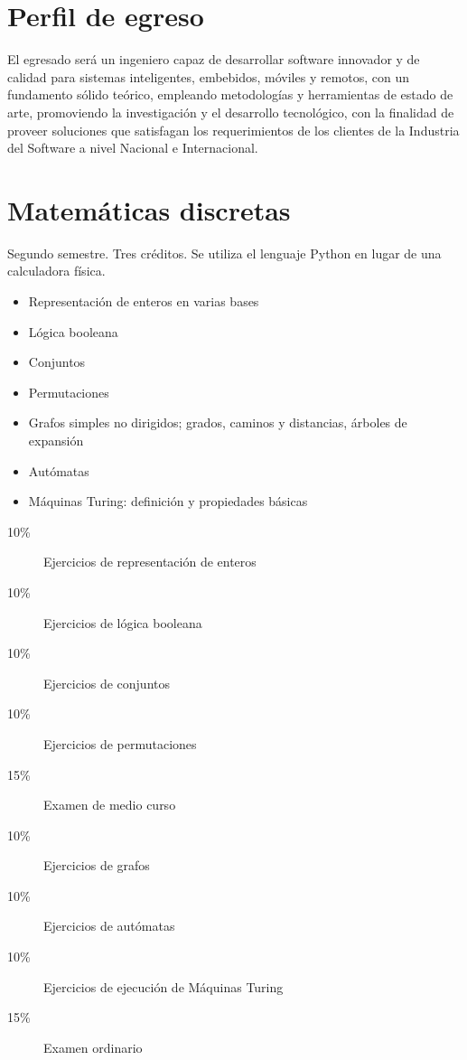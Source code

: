 \documentclass{article}
\begin{document}
\begin{multicols}{4}

\section*{Perfil de egreso}

El egresado ser\'{a} un ingeniero capaz de desarrollar software innovador
y de calidad para sistemas inteligentes, embebidos, m\'{o}viles y remotos,
con un fundamento s\'{o}lido te\'{o}rico, empleando metodolog\'{i}as y
herramientas de estado de arte, promoviendo la investigaci\'{o}n y el
desarrollo tecnol\'{o}gico, con la finalidad de proveer soluciones que
satisfagan los requerimientos de los clientes de la Industria del
Software a nivel Nacional e Internacional.

\vfill\null \columnbreak

\hypertarget{md}{\section*{Matem\'{a}ticas discretas}}

Segundo semestre. Tres cr\'{e}ditos. Se utiliza el lenguaje Python en
lugar de una calculadora f\'{i}sica. 

\begin{itemize}
\item{Representaci\'{o}n de enteros en varias bases}
\item{L\'{o}gica booleana}
\item{Conjuntos}
\item{Permutaciones}  
\item{Grafos simples no dirigidos; grados, caminos y distancias, \'{a}rboles de expansi\'{o}n}
\item{Aut\'{o}matas}
\item{M\'{a}quinas Turing: definici\'{o}n y propiedades b\'{a}sicas}
\end{itemize}

\begin{description}
\item[10\%]{Ejercicios de representaci\'{o}n de enteros}
\item[10\%]{Ejercicios de l\'{o}gica booleana}
\item[10\%]{Ejercicios de conjuntos}
\item[10\%]{Ejercicios de permutaciones}
\item[15\%]{Examen de medio curso}
\item[10\%]{Ejercicios de grafos}
\item[10\%]{Ejercicios de aut\'{o}matas}
\item[10\%]{Ejercicios de ejecuci\'{o}n de M\'{a}quinas Turing}        
\item[15\%]{Examen ordinario}
\end{description}


\end{multicols}
\end{document}
